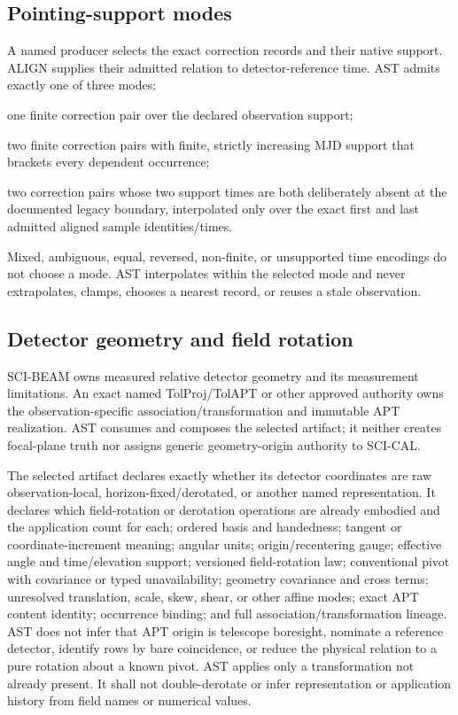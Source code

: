 \subsection{Pointing-support modes}

A named producer selects the exact correction records and their native
support.  ALIGN supplies their admitted relation to detector-reference time.
AST admits exactly one of three modes:
\begin{description}[style=nextline,leftmargin=1.45em]
  \item[\texttt{constant}] one finite correction pair over the declared
    observation support;
  \item[\texttt{bracketed\_mjd}] two finite correction pairs with finite,
    strictly increasing MJD support that brackets every dependent occurrence;
  \item[\texttt{legacy\_observation\_span}] two correction pairs whose two
    support times are both deliberately absent at the documented legacy
    boundary, interpolated only over the exact first and last admitted aligned
    sample identities/times.
\end{description}
Mixed, ambiguous, equal, reversed, non-finite, or unsupported time encodings
do not choose a mode.  AST interpolates within the selected mode and never
extrapolates, clamps, chooses a nearest record, or reuses a stale observation.

\subsection{Detector geometry and field rotation}

SCI-BEAM owns measured relative detector geometry and its measurement
limitations.  An exact named TolProj/TolAPT or other approved authority owns
the observation-specific association/transformation and immutable APT
realization.  AST consumes and composes the selected artifact; it neither
creates focal-plane truth nor assigns generic geometry-origin authority to
SCI-CAL.

The selected artifact declares exactly whether its detector coordinates are
raw observation-local, horizon-fixed/derotated, or another named
representation. It declares which field-rotation or derotation operations are
already embodied and the application count for each; ordered basis and handedness; tangent or
coordinate-increment meaning; angular units; origin/recentering gauge;
effective angle and time/elevation support; versioned field-rotation law;
conventional pivot with covariance or typed unavailability; geometry
covariance and cross terms; unresolved translation, scale, skew, shear, or
other affine modes; exact APT content identity; occurrence binding; and full
association/transformation lineage.  AST does not infer that APT origin is
telescope boresight, nominate a reference detector, identify rows by bare
coincidence, or reduce the physical relation to a pure rotation about a known
pivot. AST applies only a transformation not already present. It shall not
double-derotate or infer representation or application history from field
names or numerical values.

